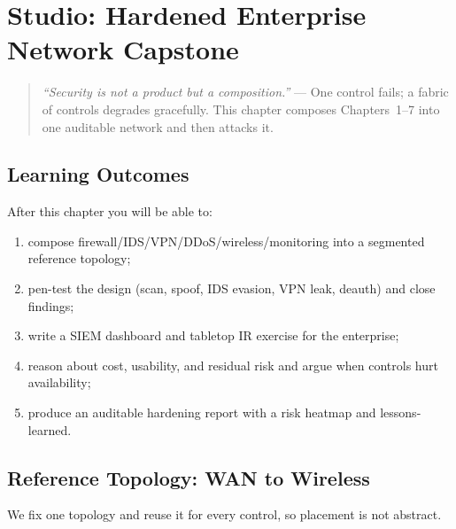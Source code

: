 \chapter{Studio: Hardened Enterprise Network Capstone}\label{ch:capstone}
\sloppy

\begin{quote}
\emph{``Security is not a product but a composition.''} --- One control fails; a fabric of controls degrades gracefully. This chapter composes Chapters~1--7 into one auditable network and then attacks it.
\end{quote}

\noindent{}
\vspace{0.4em}

\section*{Learning Outcomes}
After this chapter you will be able to:
\begin{enumerate}[label=(L\arabic*)]
    \item compose firewall/IDS/VPN/DDoS/wireless/monitoring into a segmented reference topology;
    \item pen-test the design (scan, spoof, IDS evasion, VPN leak, deauth) and close findings;
    \item write a SIEM dashboard and tabletop IR exercise for the enterprise;
    \item reason about cost, usability, and residual risk and argue when controls hurt availability;
    \item produce an auditable hardening report with a risk heatmap and lessons-learned.
\end{enumerate}

\section{Reference Topology: WAN to Wireless}\label{sec:reftopo}
We fix one topology and reuse it for every control, so placement is not abstract.

